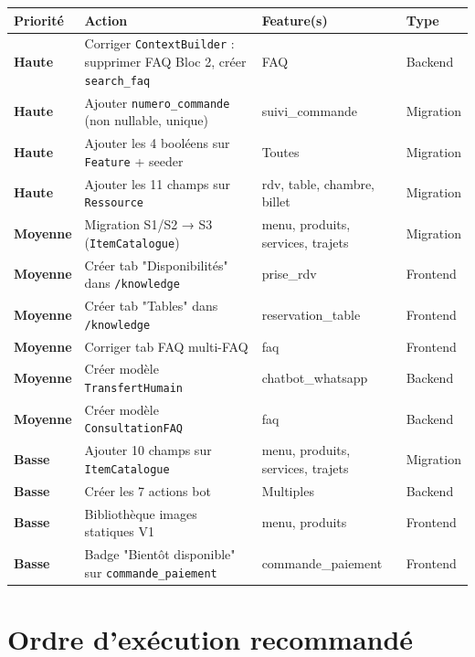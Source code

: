 \documentclass[11pt,a4paper]{article}
\newcommand{\slug}[1]{\texttt{\color{AGTDark}#1}}
\newcommand{\prio}[1]{\textcolor{AGTRed}{\textbf{#1}}}
\newcommand{\priom}[1]{\textcolor{AGTOrange}{\textbf{#1}}}
\newcommand{\priob}[1]{\textcolor{AGTGreen}{\textbf{#1}}}
\begin{document}
\begin{center}
\begin{longtable}{lp{7cm}p{3.5cm}l}
\toprule
\textbf{Priorité} & \textbf{Action} & \textbf{Feature(s)} & \textbf{Type} \\
\midrule
\endhead
\prio{Haute} & Corriger \slug{ContextBuilder} : supprimer FAQ Bloc 2, créer \slug{search\_faq} & FAQ & Backend \\[3pt]
\prio{Haute} & Ajouter \slug{numero\_commande} (non nullable, unique) & suivi\_commande & Migration \\[3pt]
\prio{Haute} & Ajouter les 4 booléens sur \slug{Feature} + seeder & Toutes & Migration \\[3pt]
\prio{Haute} & Ajouter les 11 champs sur \slug{Ressource} & rdv, table, chambre, billet & Migration \\[6pt]
\priom{Moyenne} & Migration S1/S2 → S3 (\slug{ItemCatalogue}) & menu, produits, services, trajets & Migration \\[3pt]
\priom{Moyenne} & Créer tab "Disponibilités" dans \texttt{/knowledge} & prise\_rdv & Frontend \\[3pt]
\priom{Moyenne} & Créer tab "Tables" dans \texttt{/knowledge} & reservation\_table & Frontend \\[3pt]
\priom{Moyenne} & Corriger tab FAQ multi-FAQ & faq & Frontend \\[3pt]
\priom{Moyenne} & Créer modèle \slug{TransfertHumain} & chatbot\_whatsapp & Backend \\[3pt]
\priom{Moyenne} & Créer modèle \slug{ConsultationFAQ} & faq & Backend \\[6pt]
\priob{Basse} & Ajouter 10 champs sur \slug{ItemCatalogue} & menu, produits, services, trajets & Migration \\[3pt]
\priob{Basse} & Créer les 7 actions bot & Multiples & Backend \\[3pt]
\priob{Basse} & Bibliothèque images statiques V1 & menu, produits & Frontend \\[3pt]
\priob{Basse} & Badge "Bientôt disponible" sur \slug{commande\_paiement} & commande\_paiement & Frontend \\
\bottomrule
\end{longtable}
\end{center}

\section{Ordre d'exécution recommandé}
\end{document}
